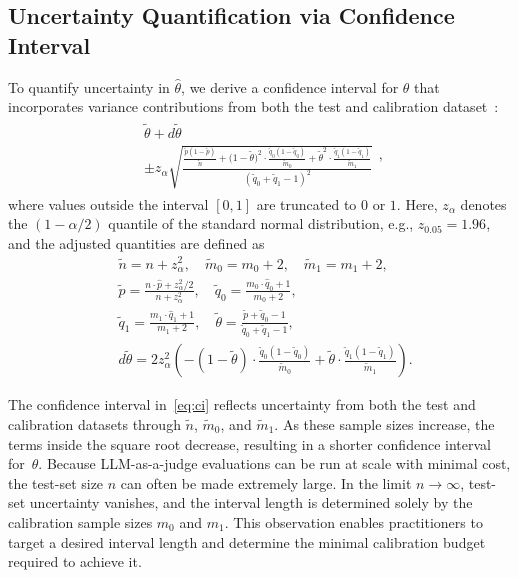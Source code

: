 \subsection{Uncertainty Quantification via Confidence Interval}

To quantify uncertainty in $\hat{\theta}$, we derive a confidence interval for $\theta$ that incorporates variance contributions from both the test and calibration dataset~\citep{lang2014confidence}:
\begin{align}
\label{eq:ci}
\boxed{
\begin{aligned}
&\tilde{\theta} + d\tilde{\theta}
\\
&\pm z_{\alpha}
\sqrt{
        \frac{
        \frac{\tilde{p}(1 - \tilde{p})}{\tilde{n}}
        + \big(1 - \tilde{\theta}\big)^2 \!\cdot\! \frac{\tilde{q}_0(1 - \tilde{q}_0)}{\tilde{m}_0}
        + \tilde{\theta}^2 \!\cdot\! \frac{\tilde{q}_1(1 - \tilde{q}_1)}{\tilde{m}_1} 
        }{
        (\tilde{q}_0 + \tilde{q}_1 - 1)^2
        }
    }
\end{aligned}
},\;\;
\end{align}
where values outside the interval $[0,1]$ are truncated to $0$ or $1$. Here, $z_{\alpha}$ denotes the $(1-\alpha/2)$ quantile of the standard normal distribution, e.g., $z_{0.05} = 1.96$, and the adjusted quantities are defined as
\begin{align}
    &\tilde{n} = n + z_{\alpha}^2,
    \quad
    \tilde{m}_0 = m_0 + 2,
    \quad
    \tilde{m}_1 = m_1 + 2,
    \\
    &
    \tilde{p} = \frac{n \cdot \hat{p} + z_{\alpha}^2 / 2}{n + z_{\alpha}^2},
    \quad
    \tilde{q}_0 = \frac{m_0 \cdot \hat{q}_0 + 1}{m_0 + 2},
    \\
    &
    \label{eq:adjusted:proportion}
    \tilde{q}_1 = \frac{m_1 \cdot \hat{q}_1 + 1}{m_1 + 2},
    \quad
    \tilde{\theta} = \frac{\tilde{p} + \tilde{q}_0 - 1}{\tilde{q}_0 + \tilde{q}_1 - 1},
    \\
    &
    \label{eq:adjusted:ci:center}
    d\tilde{\theta} =
    2 z_{\alpha}^2
    \left(
        - (1 - \tilde{\theta}) \cdot \tfrac{\tilde{q}_0(1 - \tilde{q}_0)}{\tilde{m}_0}
        + \tilde{\theta} \cdot \tfrac{\tilde{q}_1(1 - \tilde{q}_1)}{\tilde{m}_1}
    \right).
\end{align}

The confidence interval in~\eqref{eq:ci} reflects uncertainty from both the test and calibration datasets through $\tilde{n}$, $\tilde{m}_0$, and $\tilde{m}_1$. As these sample sizes increase, the terms inside the square root decrease, resulting in a shorter confidence interval for~$\theta$. Because LLM-as-a-judge evaluations can be run at scale with minimal cost, the test-set size $n$ can often be made extremely large. In the limit $n \to \infty$, test-set uncertainty vanishes, and the interval length is determined solely by the calibration sample sizes $m_0$ and $m_1$. This observation enables practitioners to target a desired interval length and determine the minimal calibration budget required to achieve it.

